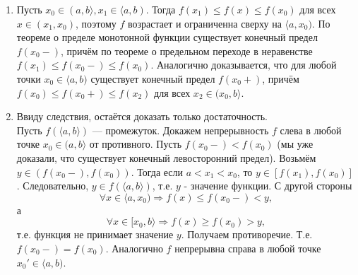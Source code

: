 \begin{enumerate}
    \item Пусть $x_0 \in (a, b \rangle, x_1 \in \langle a, b)$. Тогда $f(x_1) \leq f(x) \leq f(x_0)$ для всех $x \in (x_1, x_0)$, поэтому 
    $f$ возрастает и ограниченна сверху на $\langle a, x_0)$. По теореме о пределе монотонной функции существует конечный предел $f(x_0-)$, причём по теореме о предельном переходе в неравенстве $f(x_1) \leq f(x_0-) \leq f(x_0)$. Аналогично доказывается, что для любой точки $x_0 \in \langle a, b)$ существует конечный предел $f(x_0+)$, причём $f(x_0) \leq f(x_0+) \leq f(x_2)$ для всех $x_2 \in (x_0, b \rangle$.
    \item Ввиду следствия, остаётся доказать только достаточность.\\
    Пусть $f(\langle a, b \rangle)$ --- промежуток. Докажем непрерывность $f$ слева в любой точке 
    $x_0 \in (a, b \rangle$ от противного. Пусть $f(x_0-) < f(x_0)$ (мы уже доказали, что существует конечный левосторонний предел). Возьмём $y \in (f(x_0-), f(x_0))$. Тогда если $a < x_1 < x_0$, то $y \in [f(x_1), f(x_0)]$. Следовательно, $y \in f( \langle a, b \rangle)$, т.е. $y$ - значение функции. С другой стороны $$\forall x \in \langle a, x_0) \Rightarrow f(x) \leq f(x_0-) < y,$$а
    $$\forall x \in [x_0, b\rangle \Rightarrow f(x) \geq f(x_0) > y,$$
    т.е. функция не принимает значение $y$. Получаем противоречие. Т.е. $f(x_0-) = f(x_0)$. Аналогично $f$ непрерывна справа в любой точке $x_0' \in \langle a, b)$.
\end{enumerate}

